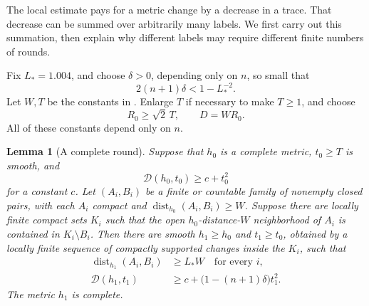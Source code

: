 \documentclass[11pt]{article}
\numberwithin{equation}{section}
\newtheorem{lemma}[theorem]{Lemma}
\theoremstyle{definition}
\theoremstyle{remark}
\begin{document}
The local estimate pays for a metric change by a decrease in a trace.
That decrease can be summed over arbitrarily many labels. We first carry
out this summation, then explain why different labels may require
different finite numbers of rounds.

Fix \(L_*=1.004\), and choose \(\delta>0\), depending only on \(n\), so small that
\begin{equation}\label{rounds:delta}
  2(n+1)\delta<1-L_*^{-2}.
\end{equation}
Let \(W,T\) be the constants in . Enlarge \(T\) if necessary
to make \(T\ge1\), and choose
\begin{equation}\label{rounds:original-scale}
  R_0\ge\sqrt2\,T,\qquad D=WR_0.
\end{equation}
All of these constants depend only on \(n\).

\begin{lemma}[A complete round]\label{rounds:round}
Suppose that \(h_0\) is a complete metric, \(t_0\ge T\) is smooth, and
\[
 \mathcal D(h_0,t_0)\ge c+t_0^2
\]
for a constant \(c\). Let \((A_i,B_i)\) be a finite or countable family of
nonempty closed pairs, with each \(A_i\) compact and
\(\operatorname{dist}_{h_0}(A_i,B_i)\ge W\). Suppose there are locally finite compact
sets \(K_i\) such that the open \(h_0\)-distance-\(W\) neighborhood of
\(A_i\) is contained in \(K_i\setminus B_i\).
Then there are smooth \(h_1\ge h_0\) and \(t_1\ge t_0\), obtained by a
locally finite sequence of compactly supported changes inside the
\(K_i\), such that
\begin{align}
 \operatorname{dist}_{h_1}(A_i,B_i)&\ge L_*W \quad\text{for every }i,\label{rounds:separation}\\
 \mathcal D(h_1,t_1)&\ge c+
 \bigl(1-(n+1)\delta\bigr)t_1^2.\label{rounds:curvature}
\end{align}
The metric \(h_1\) is complete.
\end{lemma}
\end{document}
